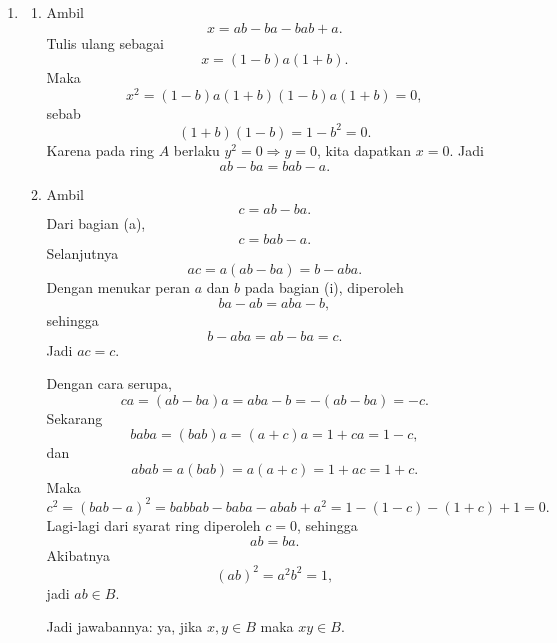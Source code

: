 \documentclass[12pt]{article}
\begin{document}
\begin{enumerate}
        Untuk $|z|=1$, ketaksamaan yang sama tetap benar karena ruas kanan sama dengan $1$ dan $|f(z)|\le 1$. Jadi
        \[
          |f(z)|\le |z|^n,\qquad \forall z\in D.
        \]

  \item
        \begin{enumerate}
          \item Ambil
                \[
                  x=ab-ba-bab+a.
                \]
                Tulis ulang sebagai
                \[
                  x=(1-b)a(1+b).
                \]
                Maka
                \[
                  x^2=(1-b)a(1+b)(1-b)a(1+b)=0,
                \]
                sebab
                \[
                  (1+b)(1-b)=1-b^2=0.
                \]
                Karena pada ring $A$ berlaku $y^2=0\Rightarrow y=0$, kita dapatkan $x=0$. Jadi
                \[
                  ab-ba=bab-a.
                \]

          \item Ambil
                \[
                  c=ab-ba.
                \]
                Dari bagian (a),
                \[
                  c=bab-a.
                \]
                Selanjutnya
                \[
                  ac=a(ab-ba)=b-aba.
                \]
                Dengan menukar peran $a$ dan $b$ pada bagian (i), diperoleh
                \[
                  ba-ab=aba-b,
                \]
                sehingga
                \[
                  b-aba=ab-ba=c.
                \]
                Jadi $ac=c$.

                Dengan cara serupa,
                \[
                  ca=(ab-ba)a=aba-b=-(ab-ba)=-c.
                \]
                Sekarang
                \[
                  baba=(bab)a=(a+c)a=1+ca=1-c,
                \]
                dan
                \[
                  abab=a(bab)=a(a+c)=1+ac=1+c.
                \]
                Maka
                \[
                  c^2=(bab-a)^2
                  =babbab-baba-abab+a^2
                  =1-(1-c)-(1+c)+1=0.
                \]
                Lagi-lagi dari syarat ring diperoleh $c=0$, sehingga
                \[
                  ab=ba.
                \]
                Akibatnya
                \[
                  (ab)^2=a^2b^2=1,
                \]
                jadi $ab\in B$.

                Jadi jawabannya: ya, jika $x,y\in B$ maka $xy\in B$.
        \end{enumerate}


\end{enumerate}
\end{document}
